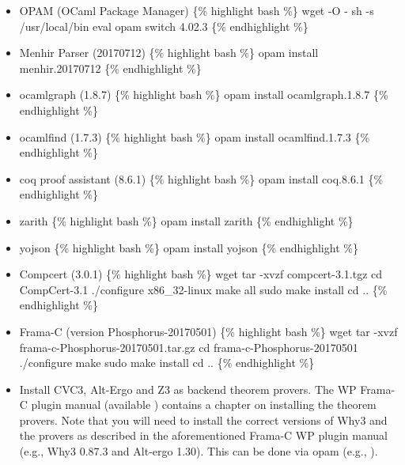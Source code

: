 \documentclass[letterpaper,10pt,english]{sphinxmanual}
\begin{document}
\begin{itemize}
\item {} 
OPAM (OCaml Package Manager) \{\% highlight bash \%\} wget
 -O
- \textbar{} sh -s /usr/local/bin eval  opam switch 4.02.3
\{\% endhighlight \%\}

\item {} 
Menhir Parser (20170712) \{\% highlight bash \%\} opam install
menhir.20170712 \{\% endhighlight \%\}

\item {} 
ocamlgraph (1.8.7) \{\% highlight bash \%\} opam install ocamlgraph.1.8.7
\{\% endhighlight \%\}

\item {} 
ocamlfind (1.7.3) \{\% highlight bash \%\} opam install ocamlfind.1.7.3
\{\% endhighlight \%\}

\item {} 
coq proof assistant (8.6.1) \{\% highlight bash \%\} opam install
coq.8.6.1 \{\% endhighlight \%\}

\item {} 
zarith \{\% highlight bash \%\} opam install zarith \{\% endhighlight \%\}

\item {} 
yojson \{\% highlight bash \%\} opam install yojson \{\% endhighlight \%\}

\item {} 
Compcert (3.0.1) \{\% highlight bash \%\} wget
 tar -xvzf
compcert-3.1.tgz cd CompCert-3.1 ./configure x86\_32-linux make all
sudo make install cd .. \{\% endhighlight \%\}

\item {} 
Frama-C (version Phosphorus-20170501) \{\% highlight bash \%\} wget
 tar
-xvzf frama-c-Phosphorus-20170501.tar.gz cd
frama-c-Phosphorus-20170501 ./configure make sudo make install cd ..
\{\% endhighlight \%\}

\item {} 
Install CVC3, Alt-Ergo and Z3 as backend theorem provers. The WP
Frama-C plugin manual (available
)
contains a chapter on installing the theorem provers. Note that you
will need to install the correct versions of Why3 and the provers as
described in the aforementioned Frama-C WP plugin manual (e.g., Why3
0.87.3 and Alt-ergo 1.30). This can be done via opam (e.g.,
).

\end{itemize}
\end{document}
